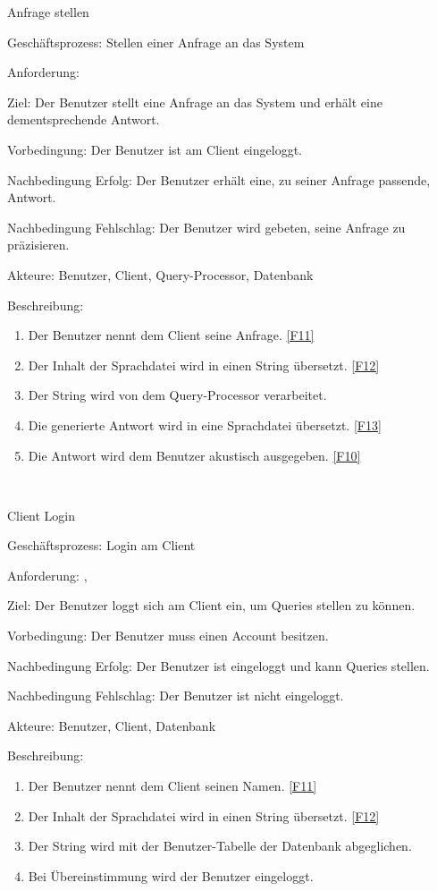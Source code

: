 \begin{function}{20}{Anfrage stellen}
\item[Geschäftsprozess:] Stellen einer Anfrage an das System
\item[Anforderung:] 
\item[Ziel:] Der Benutzer stellt eine Anfrage an das System und erhält eine dementsprechende Antwort.
\item[Vorbedingung:] Der Benutzer ist am Client eingeloggt.
\item[Nachbedingung Erfolg:] Der Benutzer erhält eine, zu seiner Anfrage passende, Antwort.
\item[Nachbedingung Fehlschlag:] Der Benutzer wird gebeten, seine Anfrage zu präzisieren.
\item[Akteure:] Benutzer, Client, Query-Processor, Datenbank
\item[Beschreibung:] ~
\begin{enumerate}
\item Der Benutzer nennt dem Client seine Anfrage. \ref{F11}
\item Der Inhalt der Sprachdatei wird in einen String übersetzt. \ref{F12}
\item Der String wird von dem Query-Processor verarbeitet.
\item Die generierte Antwort wird in eine Sprachdatei übersetzt. \ref{F13}
\item Die Antwort wird dem Benutzer akustisch ausgegeben. \ref{F10}
\end{enumerate}
\end{function} ~

\begin{function}{30}{Client Login}
\item[Geschäftsprozess:] Login am Client
\item[Anforderung:] , 
\item[Ziel:] Der Benutzer loggt sich am Client ein, um Queries stellen zu können.
\item[Vorbedingung:] Der Benutzer muss einen Account besitzen.
\item[Nachbedingung Erfolg:] Der Benutzer ist eingeloggt und kann Queries stellen.
\item[Nachbedingung Fehlschlag:] Der Benutzer ist nicht eingeloggt.
\item[Akteure:] Benutzer, Client, Datenbank
\item[Beschreibung:] ~
\begin{enumerate}
\item Der Benutzer nennt dem Client seinen Namen. \ref{F11}
\item Der Inhalt der Sprachdatei wird in einen String übersetzt. \ref{F12}
\item Der String wird mit der Benutzer-Tabelle der Datenbank abgeglichen.
\item Bei Übereinstimmung wird der Benutzer eingeloggt.
\end{enumerate}
\end{function} ~

